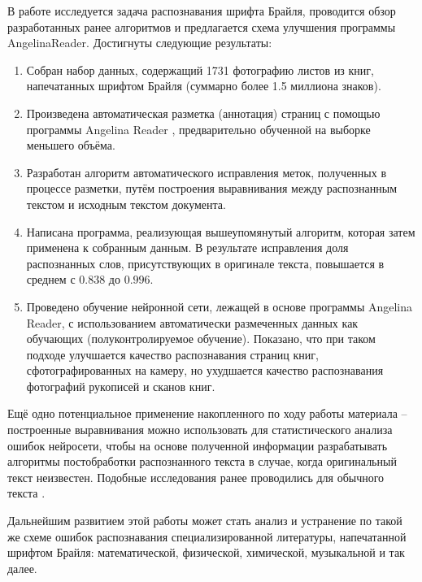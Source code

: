 \documentclass{main.tex}[subfiles]
\begin{document}
\newpage
{}
В работе исследуется задача распознавания шрифта Брайля, проводится обзор разработанных ранее алгоритмов и предлагается схема улучшения программы AngelinaReader.
Достигнуты следующие результаты:
\begin{enumerate}[noitemsep]
    \item Собран набор данных, содержащий 1731 фотографию листов из книг, напечатанных шрифтом Брайля (суммарно более 1.5 миллиона знаков).
    \item Произведена автоматическая разметка (аннотация) страниц с помощью программы Angelina Reader \cite{ovodov2020}, предварительно обученной на выборке меньшего объёма.
    \item Разработан алгоритм автоматического исправления меток, полученных в процессе разметки, путём построения выравнивания между распознанным текстом и исходным текстом документа.
    \item Написана программа, реализующая вышеупомянутый алгоритм, которая затем применена к собранным данным.
    В результате исправления доля распознанных слов, присутствующих в оригинале текста, повышается в среднем с $ 0.838 $ до $ 0.996 $.
    \item Проведено обучение нейронной сети, лежащей в основе программы Angelina Reader, с использованием автоматически размеченных данных как обучающих (полуконтролируемое обучение).
    Показано, что при таком подходе улучшается качество распознавания страниц книг, сфотографированных на камеру, но ухудшается качество распознавания фотографий рукописей и сканов книг.
\end{enumerate}

Ещё одно потенциальное применение накопленного по ходу работы материала -- построенные выравнивания можно использовать для статистического анализа ошибок нейросети, чтобы на основе полученной информации разрабатывать алгоритмы постобработки распознанного текста в случае, когда оригинальный текст неизвестен.
Подобные исследования ранее проводились для обычного текста \cite{nguyen2019}.

Дальнейшим развитием этой работы может стать анализ и устранение по такой же схеме ошибок распознавания специализированной литературы, напечатанной шрифтом Брайля: математической, физической, химической, музыкальной и так далее.
\end{document}

